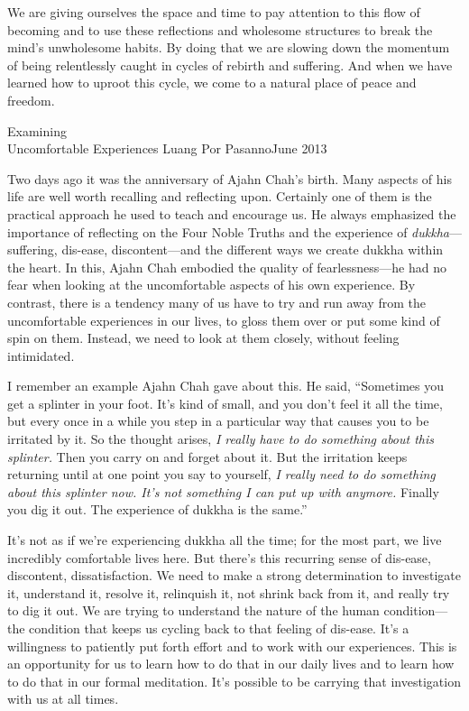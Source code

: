 We are giving ourselves the space and time to pay attention to this 
flow of becoming and to use these reflections and wholesome structures 
to break the mind's unwholesome habits. By doing that we are slowing 
down the momentum of being relentlessly caught in cycles of rebirth and 
suffering. And when we have learned how to uproot this cycle, we come 
to a natural place of peace and freedom.

{Examining\\Uncomfortable Experiences}
{Luang Por Pasanno}{June 2013}

Two days ago it was the anniversary of Ajahn Chah's birth. Many aspects 
of his life are well worth recalling and reflecting upon. Certainly one 
of them is the practical approach he used to teach and encourage us. He 
always emphasized the importance of reflecting on the Four Noble Truths 
and the experience of \emph{dukkha}---suffering, dis-ease, 
discontent---and the different ways we create dukkha within the heart. 
In this, Ajahn Chah embodied the quality of fearlessness---he had no 
fear when looking at the uncomfortable aspects of his own experience. 
By contrast, there is a tendency many of us have to try and run away 
from the uncomfortable experiences in our lives, to gloss them over or 
put some kind of spin on them. Instead, we need to look at them 
closely, without feeling intimidated.

I remember an example Ajahn Chah gave about this. He said, ``Sometimes 
you get a splinter in your foot. It's kind of small, and you don't feel 
it all the time, but every once in a while you step in a particular way 
that causes you to be irritated by it. So the thought arises, \emph{I 
really have to do something about this splinter.} Then you carry on and 
forget about it. But the irritation keeps returning until at one point 
you say to yourself, \emph{I really need to do something about this 
splinter now. It's not something I can put up with anymore.} Finally 
you dig it out. The experience of dukkha is the same.''

It's not as if we're experiencing dukkha all the time; for the most 
part, we live incredibly comfortable lives here. But there's this 
recurring sense of dis-ease, discontent, dissatisfaction. We need to 
make a strong determination to investigate it, understand it, resolve 
it, relinquish it, not shrink back from it, and really try to dig it 
out. We are trying to understand the nature of the human 
condition---the condition that keeps us cycling back to that feeling of 
dis-ease. It's a willingness to patiently put forth effort and to work 
with our experiences. This is an opportunity for us to learn how to do 
that in our daily lives and to learn how to do that in our formal 
meditation. It's possible to be carrying that investigation with us at 
all times.


